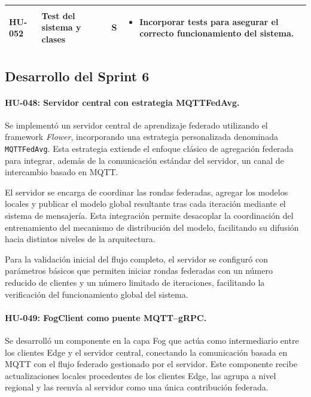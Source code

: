 \documentclass{report}
\begin{document}
\begin{table}[H]
\begin{tabular}{|l|p{4.8cm}|c|p{5.6cm}|}
HU-052 &
Test del sistema y clases&
S &
\begin{itemize}\setlength\itemsep{0.15em}
  \item Incorporar tests para asegurar el correcto funcionamiento del sistema.
\end{itemize}
\\ \hline

\end{tabular}
\end{table}

\subsection{Desarrollo del Sprint 6}
\vspace{0.15em}
\paragraph{HU-048: Servidor central con estrategia MQTTFedAvg.}

Se implementó un servidor central de aprendizaje federado utilizando el framework \textit{Flower}, incorporando una estrategia personalizada denominada \texttt{MQTTFedAvg}. Esta estrategia extiende el enfoque clásico de agregación federada para integrar, además de la comunicación estándar del servidor, un canal de intercambio basado en MQTT.

El servidor se encarga de coordinar las rondas federadas, agregar los modelos locales y publicar el modelo global resultante tras cada iteración mediante el sistema de mensajería. Esta integración permite desacoplar la coordinación del entrenamiento del mecanismo de distribución del modelo, facilitando su difusión hacia distintos niveles de la arquitectura.

Para la validación inicial del flujo completo, el servidor se configuró con parámetros básicos que permiten iniciar rondas federadas con un número reducido de clientes y un número limitado de iteraciones, facilitando la verificación del funcionamiento global del sistema.

\vspace{0.15em}
\paragraph{HU-049: FogClient como puente MQTT--gRPC.}
Se desarrolló un componente en la capa Fog que actúa como intermediario entre los clientes Edge y el servidor central, conectando la comunicación basada en MQTT con el flujo federado gestionado por el servidor. Este componente recibe actualizaciones locales procedentes de los clientes Edge, las agrupa a nivel regional y las reenvía al servidor como una única contribución federada.
\end{document}
